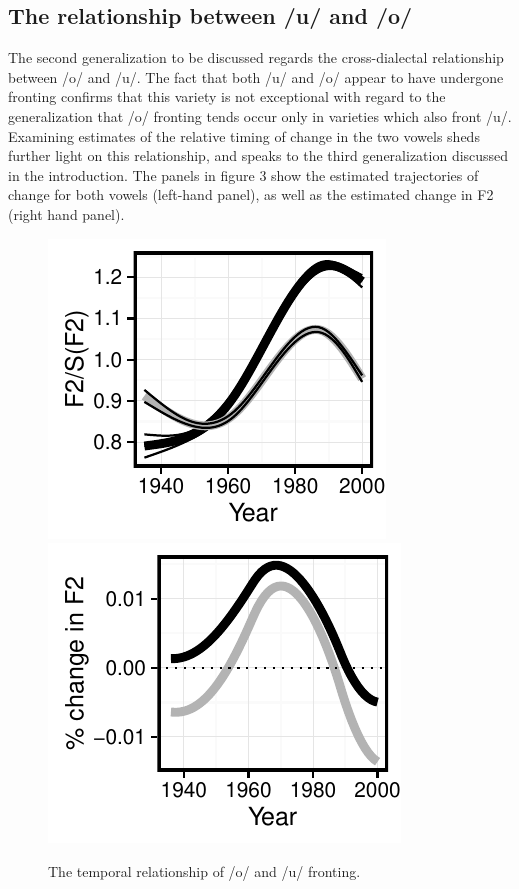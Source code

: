 \documentclass[12pt]{article}
\begin{document}
\subsection{The relationship between /u/ and /o/}
The second generalization to be discussed regards the cross-dialectal relationship between /o/ and /u/. The fact that both /u/ and /o/ appear to have undergone fronting confirms that this variety is not exceptional with regard to the generalization that /o/ fronting tends occur only in varieties which also front /u/. Examining estimates of the relative timing of change in the two vowels sheds further light on this relationship, and speaks to the third generalization discussed in the introduction. The panels in figure 3 show the estimated trajectories of change for both vowels (left-hand panel), as well as the estimated change in F2 (right hand panel). 
\vspace*{6pt}
\begin{figure}[!htpb]
\centering
\includegraphics{owuwparallel.pdf}
\includegraphics{owuwparallelROC.pdf}
\caption{The temporal relationship of /o/ and /u/ fronting.}
\end{figure}
\end{document}

